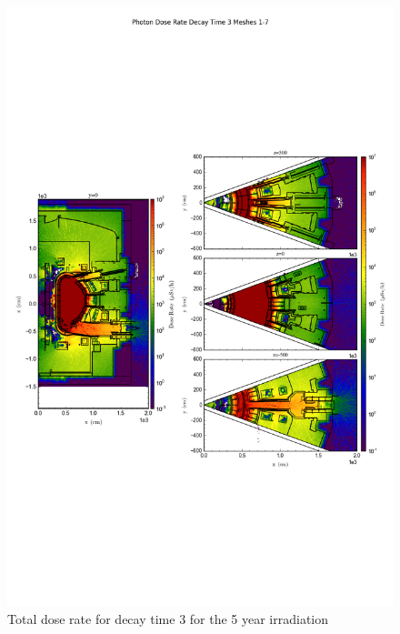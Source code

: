 \documentclass[12pt]{article}
\begin{document}
\begin{figure}[ht!]
\centering
\includegraphics[trim={0cm 8cm, 0cm 8cm},clip,scale=0.75]{../plots/final_model/5year/Photon_Dose_Rate_Decay_Time_3_Meshes_1-7.png}
\caption{Total dose rate for decay time 3 for the 5 year irradiation}
\label{fig:photons_5y_dc3_nob4c_dose}
\end{figure}
\end{document}

